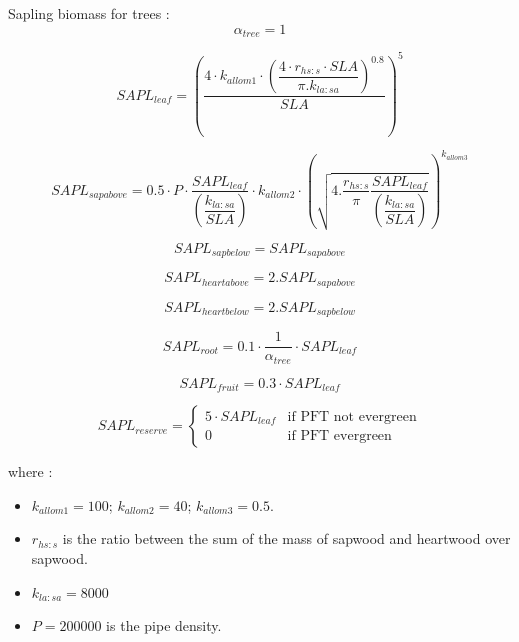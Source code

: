 Sapling biomass for trees : \\

\begin{equation}
\alpha_{tree} = 1
\end{equation}

\begin{equation}
SAPL_{leaf} =  \left( \frac {4 \cdot k_{allom1} \cdot \left( \dfrac{4 \cdot r_{hs:s} \cdot SLA }{\pi .k_{la:sa}}\right)^{0.8} }{SLA} \right)^5
\end{equation}

\begin{equation}
SAPL_{sapabove} = 0.5 \cdot P \cdot \frac{SAPL_{leaf}}{\left( \dfrac
  {k_{la:sa}}{SLA} \right) } \cdot k_{allom2} \cdot \left(
  \sqrt{4.\frac{r_{hs:s}}{\pi} \frac{SAPL_{leaf}}{ \left( \dfrac {k_{la:sa}}{SLA} \right) }} \right) ^{k_{allom3}} 
\end{equation}

\begin{equation}
SAPL_{sapbelow} = SAPL_{sapabove}
\end{equation}


\begin{equation}
SAPL_{heartabove} = 2.SAPL_{sapabove}
\end{equation}

\begin{equation}
SAPL_{heartbelow} = 2.SAPL_{sapbelow}
\end{equation}

\begin{equation}
SAPL_{root} = 0.1 \cdot \frac{1}{\alpha_{tree}} \cdot SAPL_{leaf} 
\end{equation}

\begin{equation}
SAPL_{fruit} = 0.3 \cdot SAPL_{leaf} 
\end{equation}

\begin{equation}
SAPL_{reserve} = 
\begin{cases}
5 \cdot SAPL_{leaf} & \text{if PFT not evergreen} \\
0 & \text{if PFT evergreen}
\end{cases} %
\end{equation}

where : \\
\begin{itemize}
 \item  $k_{allom1}= 100$; \quad $ k_{allom2} = 40$; \quad  $k_{allom3}= 0.5$.
 \item  $r_{hs:s}$ is the ratio between the sum of the mass of sapwood and heartwood over sapwood.
 \item  $k_{la:sa} = 8000 $
 \item  $P = 200000$ is the pipe density. 
\end{itemize}




